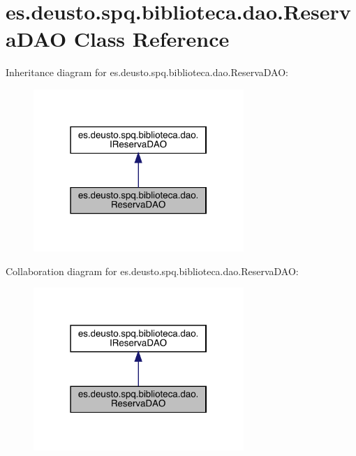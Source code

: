 \hypertarget{classes_1_1deusto_1_1spq_1_1biblioteca_1_1dao_1_1_reserva_d_a_o}{}\section{es.\+deusto.\+spq.\+biblioteca.\+dao.\+Reserva\+D\+AO Class Reference}
\label{classes_1_1deusto_1_1spq_1_1biblioteca_1_1dao_1_1_reserva_d_a_o}


Inheritance diagram for es.\+deusto.\+spq.\+biblioteca.\+dao.\+Reserva\+D\+AO\+:
\nopagebreak
\begin{figure}[H]
\begin{center}
\leavevmode
\includegraphics[width=226pt]{classes_1_1deusto_1_1spq_1_1biblioteca_1_1dao_1_1_reserva_d_a_o__inherit__graph}
\end{center}
\end{figure}


Collaboration diagram for es.\+deusto.\+spq.\+biblioteca.\+dao.\+Reserva\+D\+AO\+:
\nopagebreak
\begin{figure}[H]
\begin{center}
\leavevmode
\includegraphics[width=226pt]{classes_1_1deusto_1_1spq_1_1biblioteca_1_1dao_1_1_reserva_d_a_o__coll__graph}
\end{center}
\end{figure}
